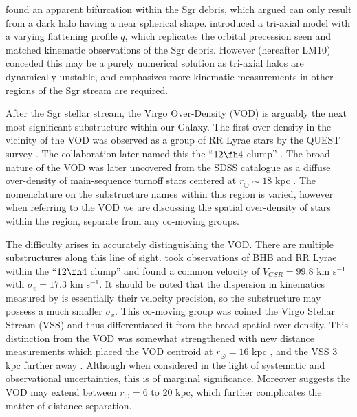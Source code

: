 \documentclass[preprint2]{aastex}
\begin{document}
\citet{Belokurov;et-al_2006} found an apparent bifurcation within the Sgr debris, which \citet{Fellhauer;et-al_2006} argued can only result from a dark halo having a near spherical shape. \citet{Law;et-al_2009} introduced a tri-axial model with a varying flattening profile $q$, which replicates the orbital precession seen and matched kinematic observations of the Sgr debris. However \citet{Law;Majewski_2010} (hereafter LM10) conceded this may be a purely numerical solution as tri-axial halos are dynamically unstable, and emphasizes more kinematic measurements in other regions of the Sgr stream are required.

After the Sgr stellar stream, the Virgo Over-Density (VOD) is arguably the next most significant substructure within our Galaxy. The first over-density in the vicinity of the VOD was observed as a group of RR Lyrae stars by the QUEST survey \citep{Vivas;et-al_2001}. The collaboration later named this the ``$12\fh4$ clump'' \citep{Zinn;et-al_2004}. The broad nature of the VOD was later uncovered from the SDSS catalogue as a diffuse over-density of main-sequence turnoff stars centered at $r_\odot \sim18$ kpc \citep[which ][dubbed as S297+63-20.5]{Newberg;et-al_2002}. The nomenclature on the substructure names within this region is varied, however when referring to the VOD we are discussing the spatial over-density of stars within the region, separate from any co-moving groups.
	
The difficulty arises in accurately distinguishing the VOD. There are multiple substructures along this line of sight. \citet{Duffau;et-al_2006} took observations of BHB and RR Lyrae within the ``$12\fh4$ clump'' and found a common velocity of $V_{GSR} = 99.8$ km s$^{-1}$ with $\sigma_{v} = 17.3$ km s$^{-1}$. It should be noted that the dispersion in kinematics measured by \citet{Duffau;et-al_2006} is essentially their velocity precision, so the substructure may possess a much smaller $\sigma_v$. This co-moving group was coined the Virgo Stellar Stream (VSS) and thus differentiated it from the broad spatial over-density. This distinction from the VOD was somewhat strengthened with new distance measurements which placed the VOD centroid at $r_\odot = 16$ kpc \citep{Juric;et-al_2008, Keller_2010}, and the VSS 3 kpc further away \citep{Duffau;et-al_2006}. Although when considered in the light of systematic and observational uncertainties, this is of marginal significance. Moreover \citet{Juric;et-al_2008} suggests the VOD may extend between $r_\odot = 6$ to 20 kpc, which further complicates the matter of distance separation.
 
\end{document}
